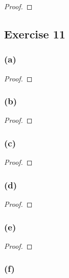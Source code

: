\documentclass[14pt]{extarticle}
\begin{document}
\begin{proof}

\end{proof}

\subsection{Exercise 11}

\subsubsection{(a)}

\begin{proof}

\end{proof}

\subsubsection{(b)}

\begin{proof}

\end{proof}

\subsubsection{(c)}

\begin{proof}

\end{proof}

\subsubsection{(d)}

\begin{proof}

\end{proof}

\subsubsection{(e)}

\begin{proof}

\end{proof}

\subsubsection{(f)}
\end{document}
